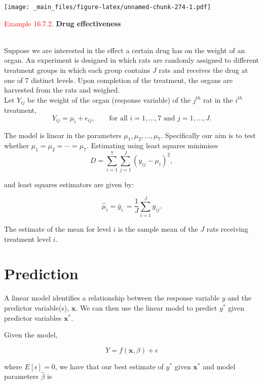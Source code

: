 \documentclass[
]{book}
\begin{document}
\texttt{[image: \_main\_files/figure-latex/unnamed-chunk-274-1.pdf]}

\leavevmode{}%
\textcolor{red}{Example 16.7.2.}
{\textbf{Drug effectiveness}}\\
\strut \\
Suppose we are interested in the effect a certain drug has on the weight of an organ. An experiment is designed in which rats are randomly assigned to different treatment groups in which each group contains \(J\) rats and receives the drug at one of 7 distinct levels. Upon completion of the treatment, the organs are harvested from the rats and weighed.\\

Let \(Y_{ij}\) be the weight of the organ (response variable) of the \(j^{th}\) rat in the \(i^{th}\) treatment,\\

\[Y_{ij} = \mu_i + \epsilon_{ij}, \qquad \text{for all } i=1,\dots,7 \text{ and } j=1,\dots,J.\]

The model is linear in the parameters \(\mu_1, \mu_2,\dots,\mu_7\). Specifically our aim is to test whether \(\mu_1 = \mu_2 = \cdots = \mu_7\). Estimating using least squares minimises
\[D = \sum\limits_{i=1}^7 \sum\limits_{j=1}^J (y_{ij} - \mu_i)^2,\]

and least squares estimators are given by:

\[\hat{\mu}_i = \bar{y}_{i.} = \frac{1}{J} \sum\limits_{i=1}^J y_{ij}.\]

The estimate of the mean for level \(i\) is the sample mean of the \(J\) rats receiving treatment level \(i\).

\hypertarget{Sec_LinearI:Prediction}{%
\section{Prediction}\label{Sec_LinearI:Prediction}}

A linear model identifies a relationship between the response variable \(y\) and the predictor variable(s), \(\mathbf{x}\). We can then use the linear model to predict \(y^\ast\) given predictor variables \(\mathbf{x}^\ast\).

Given the model,

\[ Y = f (\mathbf{x},\beta) + \epsilon\]

where \(E[\epsilon]=0\), we have that our best estimate of \(y^\ast\) given \(\mathbf{x}^\ast\) and model parameters \(\hat{\beta}\) is\\
\end{document}
